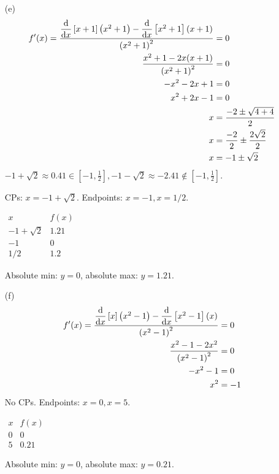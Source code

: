 \documentclass{article}
\newcommand*{\paren}[1]{\ensuremath\left(#1\right)}
\newcommand*{\Deriv}[2][x]{\ensuremath{\dfrac{\mathrm{d}}{\mathrm{d}#1}\left[#2\right]}}
\begin{document}
\begin{itemize}
	\item[(e)]
	\begin{align*}
		f'(x)=\frac{\Deriv{x+1}\paren{x^2+1}-\Deriv{x^2+1}\paren{x+1}}{\paren{x^2+1}^2}&=0 \\
		\frac{x^2+1-2x(x+1)}{\paren{x^2+1}^2}&=0 \\
		-x^2-2x+1&=0 \\
		x^2+2x-1&=0 \\
		x&=\frac{-2\pm\sqrt{4+4}}{2} \\
		x&=\frac{-2}{2}\pm\frac{2\sqrt{2}}{2} \\
		x&=-1\pm\sqrt{2}
	\end{align*}
	$-1+\sqrt{2}\approx0.41\in\left[-1,\frac{1}{2}\right],-1-\sqrt{2}\approx-2.41\not\in\left[-1,\frac{1}{2}\right]$.
	
	CPs: $x=-1+\sqrt{2}$. Endpoints: $x=-1,x=1/2$.
	\begin{center}
		$\begin{array}{c|c}
			x & f(x) \\
			\hline
			-1+\sqrt{2} & 1.21 \\
			-1 & 0 \\
			1/2 & 1.2
		\end{array}$
	\end{center}
	Absolute min: $y=0$, absolute max: $y=1.21$.

	\item[(f)]
	\begin{align*}
		f'(x)=\frac{\Deriv{x}\paren{x^2-1}-\Deriv{x^2-1}\paren{x}}{\paren{x^2-1}^2}&=0 \\
		\frac{x^2-1-2x^2}{\paren{x^2-1}^2}&=0 \\
		-x^2-1&=0 \\
		x^2&=-1 \\
	\end{align*}	
	No CPs. Endpoints: $x=0,x=5$.
	\begin{center}
		$\begin{array}{c|c}
			x & f(x) \\
			\hline
			0 & 0 \\
			5 & 0.21
		\end{array}$
	\end{center}
	Absolute min: $y=0$, absolute max: $y=0.21$.
\end{itemize}
\end{document}
